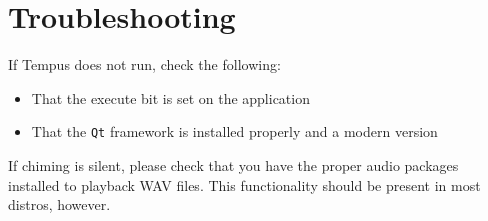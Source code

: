 \section{Troubleshooting}

If Tempus does not run, check the following:
\begin{itemize}
    \item That the execute bit is set on the application
    \item That the \texttt{Qt} framework is installed properly and a modern version
\end{itemize}

If chiming is silent, please check that you have the proper audio packages installed to playback WAV files. This functionality should be present in most distros, however.

